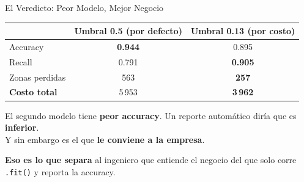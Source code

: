 \documentclass[aspectratio=169, 11pt]{beamer}
\begin{document}
\begin{frame}[shrink=12]{El Veredicto: Peor Modelo, Mejor Negocio}
  \vspace{-6pt}
  \centering
  {\footnotesize
  \renewcommand{\arraystretch}{1.5}
  \begin{tabular}{@{}l c c@{}}
    \toprule
     & {\bfseries\color{textMuted} Umbral 0.5 (por defecto)} & {\bfseries\color{codeGreen} Umbral 0.13 (por costo)} \\
    \midrule
    \rowcolor{arcaGray}
    Accuracy & \textbf{0.944} & 0.895 \\
    Recall & 0.791 & \textbf{0.905} \\
    Zonas perdidas & 563 & \textbf{257} \\
    \rowcolor{arcaGray}
    \textbf{Costo total} & 5\,953 & {\color{codeGreen}\bfseries 3\,962} \\
    \bottomrule
  \end{tabular}
  }

  \vspace{10pt}
  \begin{tcolorbox}[colback=arcaGray, colframe=arcaRed, boxrule=0pt, leftrule=3pt,
    arc=3pt, left=8pt, right=8pt, top=6pt, bottom=6pt, width=0.88\textwidth]
    {\footnotesize\color{arcaDark}
      El segundo modelo tiene \textbf{peor accuracy}. Un reporte automático
      diría que es \textbf{inferior}.\\[4pt]
      Y sin embargo es el que \textbf{le conviene a la empresa}.}
  \end{tcolorbox}

  \vspace{8pt}
  {\footnotesize\color{arcaDark}
    \faStar\hspace{4pt}%
    \textbf{Eso es lo que separa} al ingeniero que entiende el negocio
    del que solo corre \texttt{.fit()} y reporta la accuracy.}
\end{frame}
\end{document}
